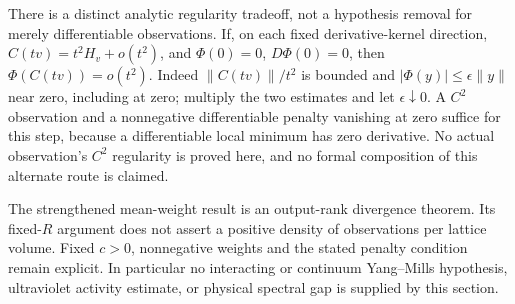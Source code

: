 There is a distinct analytic regularity tradeoff, not a hypothesis removal
for merely differentiable observations. If, on each fixed derivative-kernel
direction, $C(tv)=t^2H_v+o(t^2)$, and $\Phi(0)=0$, $D\Phi(0)=0$, then
$\Phi(C(tv))=o(t^2)$. Indeed $\|C(tv)\|/t^2$ is bounded and
$|\Phi(y)|\leq\epsilon\|y\|$ near zero, including at zero; multiply the
two estimates and let $\epsilon\downarrow0$. A $C^2$ observation and a
nonnegative differentiable penalty vanishing at zero suffice for this
step, because a differentiable local minimum has zero derivative.
No actual observation's $C^2$ regularity is proved here, and no formal
composition of this alternate route is claimed.

The strengthened mean-weight result is an output-rank divergence theorem.
Its fixed-$R$ argument does not assert a positive density of observations
per lattice volume. Fixed $c>0$, nonnegative weights and the stated
penalty condition remain explicit. In particular no interacting or
continuum Yang--Mills hypothesis, ultraviolet activity estimate, or
physical spectral gap is supplied by this section.
